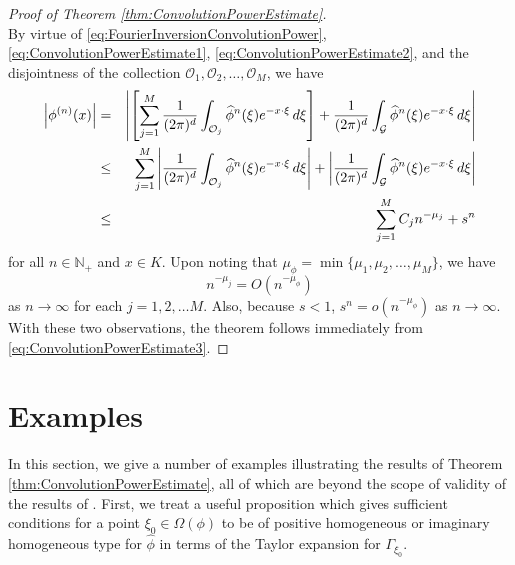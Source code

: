 \documentclass[11pt, letter]{book}
\newcommand{\lb}{\left[}
\newcommand{\rb}{\right]}
\begin{document}
\begin{proof}[Proof of Theorem \ref{thm:ConvolutionPowerEstimate}]
\begin{equation*}
\end{equation*}
By virtue of \eqref{eq:FourierInversionConvolutionPower}, \eqref{eq:ConvolutionPowerEstimate1}, \eqref{eq:ConvolutionPowerEstimate2}, and the disjointness of the collection $\mathcal{O}_1,\mathcal{O}_2,\dots,\mathcal{O}_M$, we have
\begin{eqnarray}\label{eq:ConvolutionPowerEstimate3}\nonumber
    \abs{\phi^{(n)}(x)}
    &=&\abs{\lb \sum_{j=1}^M\frac{1}{(2\pi)^d}\int_{\mathcal{O}_j}\widehat{\phi}^n(\xi)e^{-x\cdot\xi}\,d\xi \rb
    +\frac{1}{(2\pi)^d}\int_{\mathcal{G}}\widehat{\phi}^n(\xi)e^{-x\cdot\xi}\,d\xi}\\\nonumber
    &\leq&\sum_{j=1}^M\abs{\frac{1}{(2\pi)^d}\int_{\mathcal{O}_j}\widehat{\phi}^n(\xi)e^{-x\cdot\xi}\,d\xi}+\abs{\frac{1}{(2\pi)^d}\int_{\mathcal{G}}\widehat{\phi}^n(\xi)e^{-x\cdot\xi}\,d\xi}\\
    &\leq&\sum_{j=1}^M C_jn^{-\mu_j}+s^n
\end{eqnarray}
for all $n\in\mathbb{N}_+$ and $x\in K$. Upon noting that $\mu_\phi=\min\{\mu_1,\mu_2,\dots,\mu_M\}$, we have
\begin{equation*}
    n^{-\mu_j}=O(n^{-\mu_\phi})
\end{equation*}
as $n\to\infty$ for each $j=1,2,\dots M$. Also, because $s<1$, $s^n=o(n^{-\mu_\phi})$ as $n\to \infty$. With these two observations, the theorem follows immediately from \eqref{eq:ConvolutionPowerEstimate3}.
\end{proof}



\section{Examples}\label{sec:Examples}



In this section, we give a number of examples illustrating the results of Theorem \ref{thm:ConvolutionPowerEstimate}, all of which are beyond the scope of validity of the results of \cite{randles_convolution_2017}. First, we treat a useful proposition which gives sufficient conditions for a point $\xi_0\in\Omega(\phi)$ to be of positive homogeneous or imaginary homogeneous type for $\hat{\phi}$ in terms of the Taylor expansion for $\Gamma_{\xi_0}$.
\end{document}

